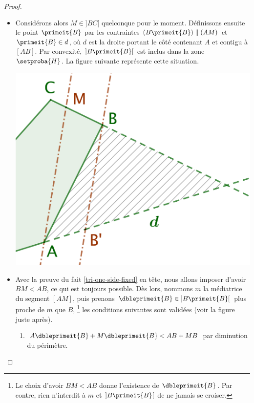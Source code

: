 \begin{proof}
\begin{itemize}
        \item Considérons alors $M \in {]BC[}$ quelconque pour le moment.
        Définissons ensuite le point $\primeit{B}$ par les contraintes $(B \primeit{B}) \parallel (AM)$
        et
        $\primeit{B} \in d$, où $d$ est la droite portant le côté contenant $A$ et contigu à $[AB]$.
        Par convexité, $]B \primeit{B}[$ est inclus dans la zone $\setproba{H}$.
        La figure suivante représente cette situation.
        \begin{center}
            \includegraphics[scale=.4]{add-vertex-1-1.png}
        \end{center}



        \item Avec la preuve du fait \ref{tri-one-side-fixed} en tête, nous allons imposer d'avoir $BM < AB$, ce qui est toujours possible.
        Dès lors,
        nommons $m$ la médiatrice du segment $[AM]$,
        puis prenons $\dbleprimeit{B} \in {]B \primeit{B}[}$ plus proche de $m$ que $B$,%
        \footnote{
            Le choix d'avoir $BM < AB$ donne l'existence de $\dbleprimeit{B}$.
            Par contre, rien n'interdit à $m$ et $]B \primeit{B}[$ de ne jamais se croiser.
        }
        les conditions suivantes sont validées (voir la figure  juste après).
        \begin{enumerate}
            \item $A \dbleprimeit{B} + M \dbleprimeit{B} < AB + MB$ par diminution du périmètre.


\end{enumerate}
\end{itemize}
\end{proof}
